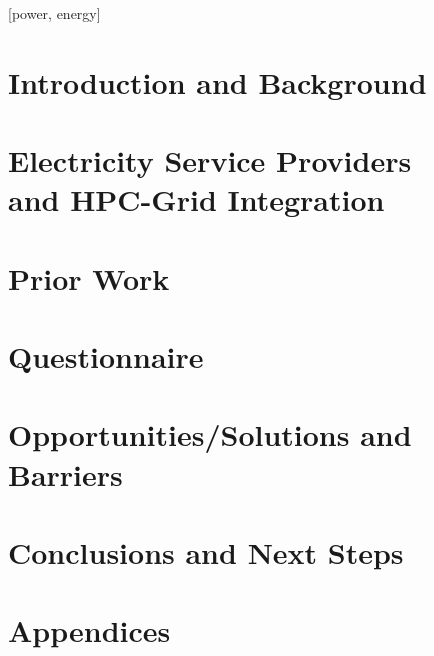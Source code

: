 \documentclass{../style/sig-alternate}
\begin{document}

[power, energy]



%
\section{Introduction and Background}

\label{sec:intro}

\section{Electricity Service Providers\\
 and HPC-Grid Integration}

\label{sec:supercomputer}

\section{Prior Work}

\label{sec:priorwork}

\section{Questionnaire} 

\label{sec:questionnaire}

\section{Opportunities/Solutions and\\ Barriers} 

\label{sec:opportunities}

\section{Conclusions and Next Steps}

\label{sec:conclusion}


%
%

%


\section{Appendices}

\label{sec:appendices}
\end{document}
